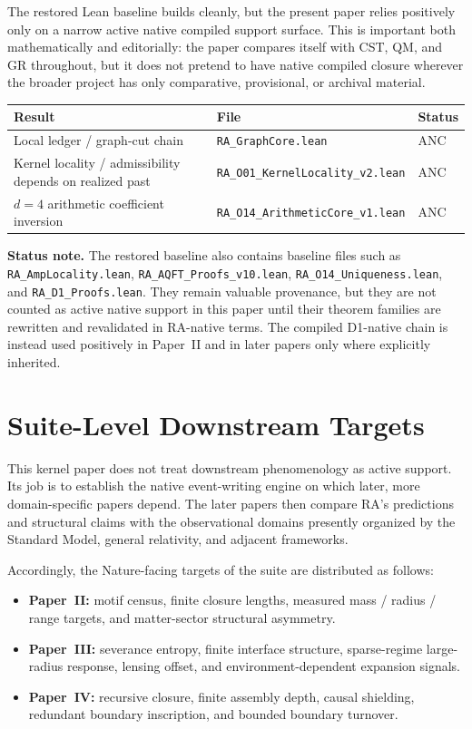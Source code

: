 \documentclass[11pt]{article}
\begin{document}
The restored Lean baseline builds cleanly, but the present paper relies positively only on a narrow active native compiled support surface. This is important both mathematically and editorially: the paper compares itself with CST, QM, and GR throughout, but it does not pretend to have native compiled closure wherever the broader project has only comparative, provisional, or archival material.

\begin{center}
\begin{tabular}{lll}
\toprule
Result & File & Status \\
\midrule
Local ledger / graph-cut chain & \texttt{RA\_GraphCore.lean} & ANC \\
Kernel locality / admissibility depends on realized past & \texttt{RA\_O01\_KernelLocality\_v2.lean} & ANC \\
$d=4$ arithmetic coefficient inversion & \texttt{RA\_O14\_ArithmeticCore\_v1.lean} & ANC \\
\bottomrule
\end{tabular}
\end{center}

\noindent\textbf{Status note.} The restored baseline also contains baseline files such as \texttt{RA\_AmpLocality.lean}, \texttt{RA\_AQFT\_Proofs\_v10.lean}, \texttt{RA\_O14\_Uniqueness.lean}, and \texttt{RA\_D1\_Proofs.lean}. They remain valuable provenance, but they are not counted as active native support in this paper until their theorem families are rewritten and revalidated in RA-native terms. The compiled D1-native chain is instead used positively in Paper~II and in later papers only where explicitly inherited.

\section{Suite-Level Downstream Targets}
\label{sec:predictions}

This kernel paper does not treat downstream phenomenology as active support. Its job is to establish the native event-writing engine on which later, more domain-specific papers depend. The later papers then compare RA's predictions and structural claims with the observational domains presently organized by the Standard Model, general relativity, and adjacent frameworks.

Accordingly, the Nature-facing targets of the suite are distributed as follows:
\begin{itemize}
    \item \textbf{Paper~II:} motif census, finite closure lengths, measured mass / radius / range targets, and matter-sector structural asymmetry.
    \item \textbf{Paper~III:} severance entropy, finite interface structure, sparse-regime large-radius response, lensing offset, and environment-dependent expansion signals.
    \item \textbf{Paper~IV:} recursive closure, finite assembly depth, causal shielding, redundant boundary inscription, and bounded boundary turnover.
\end{itemize}
\end{document}
